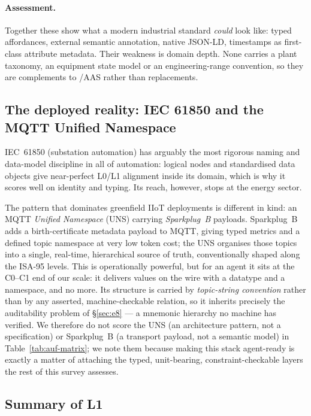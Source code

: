 \paragraph{Assessment.} Together these show what a modern industrial standard
\emph{could} look like: typed affordances, external semantic annotation, native
JSON-LD, timestamps as first-class attribute metadata. Their weakness is
domain depth. None carries a plant taxonomy, an equipment state model or an
engineering-range convention, so they are complements to \opcua/AAS rather than
replacements.

\subsection{The deployed reality: IEC 61850 and the MQTT Unified Namespace}

IEC~61850 \cite{iec61850} (substation automation) has arguably the most rigorous
naming and data-model discipline in all of automation: logical nodes and
standardised data objects give near-perfect L0/L1 alignment inside its domain,
which is why it scores well on identity and typing. Its reach, however, stops at
the energy sector.

The pattern that dominates greenfield IIoT deployments is different in kind: an
MQTT \emph{Unified Namespace} (UNS) carrying \emph{Sparkplug~B} \cite{sparkplug}
payloads. Sparkplug~B adds a birth-certificate metadata payload to MQTT, giving
typed metrics and a defined topic namespace at very low token cost; the UNS
organises those topics into a single, real-time, hierarchical source of truth,
conventionally shaped along the ISA-95 levels. This is operationally powerful, but
for an agent it sits at the C0--C1 end of our scale: it delivers values on the
wire with a datatype and a namespace, and no more. Its structure is carried by
\emph{topic-string convention} rather than by any asserted, machine-checkable
relation, so it inherits precisely the auditability problem of \S\ref{sec:e8} --- a
mnemonic hierarchy no machine has verified. We therefore do not score the UNS (an
architecture pattern, not a specification) or Sparkplug~B (a transport payload,
not a semantic model) in Table~\ref{tab:auf-matrix}; we note them because making
this stack agent-ready is exactly a matter of attaching the typed, unit-bearing,
constraint-checkable layers the rest of this survey assesses.

\subsection{Summary of L1}

